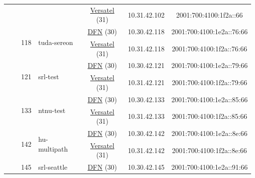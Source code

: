 \begin{small}
\begin{center}
\begin{longtable}{|c|c|c|c|c|c|c|c|}
  &  & \multicolumn{2}{|c|}{} & \multicolumn{2}{|c|}{\tiny{\href{http://www.versatel.de}{Versatel} (31)}} & \tiny{10.31.42.102} & \tiny{2001:700:4100:1f2a::66} \\* \cline{3-3}\cline{4-4}\cline{5-5}\cline{6-6}\cline{7-7}\cline{8-8}
  &  & \multirow{2}{*}{\tiny{118}} & \multicolumn{1}{|l|}{\multirow{2}{*}{\tiny{tuda-sereon}}} & \multicolumn{2}{|c|}{\tiny{\href{https://www.dfn.de}{DFN} (30)}} & \tiny{10.30.42.118} & \tiny{2001:700:4100:1e2a::76:66} \\* \cline{5-5}\cline{6-6}\cline{7-7}\cline{8-8}
  &  &  &  & \multicolumn{2}{|c|}{\tiny{\href{http://www.versatel.de}{Versatel} (31)}} & \tiny{10.31.42.118} & \tiny{2001:700:4100:1f2a::76:66} \\* \cline{3-3}\cline{4-4}\cline{5-5}\cline{6-6}\cline{7-7}\cline{8-8}
  &  & \multirow{2}{*}{\tiny{121}} & \multicolumn{1}{|l|}{\multirow{2}{*}{\tiny{srl-test}}} & \multicolumn{2}{|c|}{\tiny{\href{https://www.dfn.de}{DFN} (30)}} & \tiny{10.30.42.121} & \tiny{2001:700:4100:1e2a::79:66} \\* \cline{5-5}\cline{6-6}\cline{7-7}\cline{8-8}
  &  &  &  & \multicolumn{2}{|c|}{\tiny{\href{http://www.versatel.de}{Versatel} (31)}} & \tiny{10.31.42.121} & \tiny{2001:700:4100:1f2a::79:66} \\* \cline{3-3}\cline{4-4}\cline{5-5}\cline{6-6}\cline{7-7}\cline{8-8}
  &  & \multirow{2}{*}{\tiny{133}} & \multicolumn{1}{|l|}{\multirow{2}{*}{\tiny{ntnu-test}}} & \multicolumn{2}{|c|}{\tiny{\href{https://www.dfn.de}{DFN} (30)}} & \tiny{10.30.42.133} & \tiny{2001:700:4100:1e2a::85:66} \\* \cline{5-5}\cline{6-6}\cline{7-7}\cline{8-8}
  &  &  &  & \multicolumn{2}{|c|}{\tiny{\href{http://www.versatel.de}{Versatel} (31)}} & \tiny{10.31.42.133} & \tiny{2001:700:4100:1f2a::85:66} \\* \cline{3-3}\cline{4-4}\cline{5-5}\cline{6-6}\cline{7-7}\cline{8-8}
  &  & \multirow{2}{*}{\tiny{142}} & \multicolumn{1}{|l|}{\multirow{2}{*}{\tiny{hu-multipath}}} & \multicolumn{2}{|c|}{\tiny{\href{https://www.dfn.de}{DFN} (30)}} & \tiny{10.30.42.142} & \tiny{2001:700:4100:1e2a::8e:66} \\* \cline{5-5}\cline{6-6}\cline{7-7}\cline{8-8}
  &  &  &  & \multicolumn{2}{|c|}{\tiny{\href{http://www.versatel.de}{Versatel} (31)}} & \tiny{10.31.42.142} & \tiny{2001:700:4100:1f2a::8e:66} \\* \cline{3-3}\cline{4-4}\cline{5-5}\cline{6-6}\cline{7-7}\cline{8-8}
  &  & \multirow{2}{*}{\tiny{145}} & \multicolumn{1}{|l|}{\multirow{2}{*}{\tiny{srl-seattle}}} & \multicolumn{2}{|c|}{\tiny{\href{https://www.dfn.de}{DFN} (30)}} & \tiny{10.30.42.145} & \tiny{2001:700:4100:1e2a::91:66} \\* \cline{5-5}\cline{6-6}\cline{7-7}\cline{8-8}

\end{longtable}
\end{center}
\end{small}

